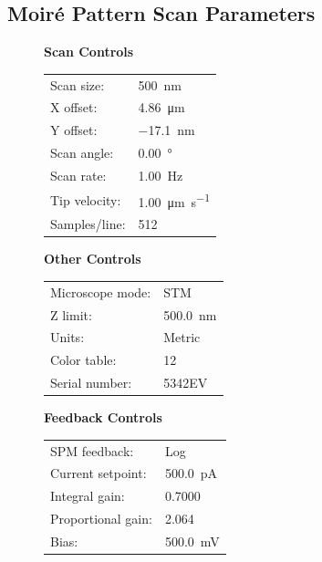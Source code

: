 \documentclass[12pt,a4paper]{article}
\begin{document}
\subsection*{Moiré Pattern Scan Parameters}
\begin{figure}[H]
    \centering
    \begin{minipage}[t]{0.48\linewidth}
        \centering
        \textbf{Scan Controls}
        \begin{tabular}{|l|l|}
        \hline
        Scan size: & \SI{500}{\nano\meter} \\
        X offset: & \SI{4.86}{\micro\meter} \\
        Y offset: & \SI{-17.1}{\nano\meter} \\
        Scan angle: & \SI{0.00}{\degree} \\
        Scan rate: & \SI{1.00}{\hertz} \\
        Tip velocity: & \SI{1.00}{\micro\meter\per\second} \\
        Samples/line: & 512 \\
        \hline
        \end{tabular}
        
        \vspace{0.5cm}
        
        \textbf{Other Controls}
        \begin{tabular}{|l|l|}
        \hline
        Microscope mode: & STM \\
        Z limit: & \SI{500.0}{\nano\meter} \\
        Units: & Metric \\
        Color table: & 12 \\
        Serial number: & 5342EV \\
        \hline
        \end{tabular}
    \end{minipage}\hfill
    \begin{minipage}[t]{0.48\linewidth}
        \centering
        \textbf{Feedback Controls}
        \begin{tabular}{|l|l|}
        \hline
        SPM feedback: & Log \\
        Current setpoint: & \SI{500.0}{\pico\ampere} \\
        Integral gain: & 0.7000 \\
        Proportional gain: & 2.064 \\
        Bias: & \SI{500.0}{\milli\volt} \\
        \hline
        \end{tabular}
        

\end{minipage}
\end{figure}
\end{document}
